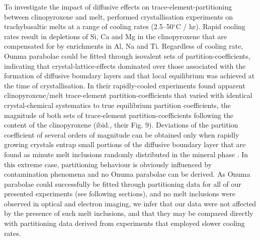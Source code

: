 \documentclass[final,authoryear,3p,times,twocolumn]{elsarticle}
\newcommand{\dgC}{$^\circ$C }
\begin{document}

To investigate the impact of diffusive effects on trace-element-partitioning between clinopyroxene and melt, \citet{Mollo2013} performed crystallisation experiments on trachybasaltic melts at a range of cooling rates (2.5--50\dgC/ hr). Rapid cooling rates result in depletions of Si, Ca and Mg in the clinopyroxene that are compensated for by enrichments in Al, Na and Ti. Regardless of cooling rate, Ounma parabolae could be fitted through isovalent sets of partition-coefficients, indicating that crystal-lattice-effects dominated over those associated with the formation of diffusive boundary layers and that local equilibrium was achieved at the time of crystallisation.
    In their rapidly-cooled experiments \citet{Mollo2013} found apparent clinopyroxene/melt trace-element partition-coefficients that varied with identical crystal-chemical systematics to true equilibrium partition coefficients, the magnitude of both sets of trace-element partition-coefficients following the  content of the clinopyroxene (ibid., their Fig. 9). 
Deviations of the partition coefficient of several orders of magnitude can be obtained only when rapidly growing crystals entrap small portions of the diffusive boundary layer that are found as minute melt inclusions randomly distributed in the mineral phase \citep{Kennedy1993}. In this extreme case, partitioning behaviour is obviously influenced by contamination phenomena and no Onuma parabolae can be derived. As Onuma parabolae could successfully be fitted through partitioning data for all of our presented experiments (see following sections), and no melt inclusions were observed in optical and electron imaging, we infer that our data were not affected by the presence of such melt inclusions, and that they may be compared directly with partitioning data derived from experiments that employed slower cooling rates.
\end{document}

